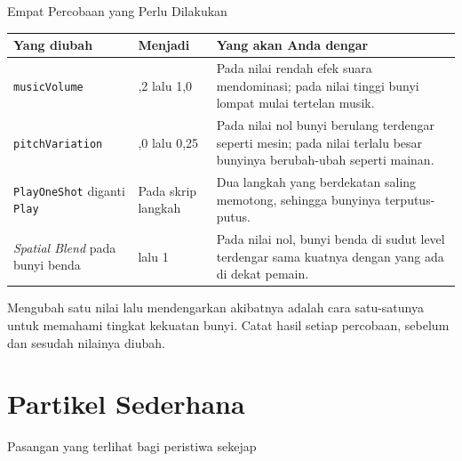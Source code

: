 \documentclass[aspectratio=169,10pt]{beamer}
\begin{document}
\begin{frame}{Empat Percobaan yang Perlu Dilakukan}
{\scriptsize
\renewcommand{\arraystretch}{1.12}
\begin{tabularx}{\textwidth}{@{}>{\raggedright\arraybackslash}p{3.55cm}
    >{\raggedright\arraybackslash}p{3.35cm}
    >{\raggedright\arraybackslash}X@{}}
\toprule
\textbf{Yang diubah} & \textbf{Menjadi} & \textbf{Yang akan Anda dengar} \\
\midrule
\texttt{musicVolume} & 0,2 lalu 1,0 &
  Pada nilai rendah efek suara mendominasi; pada nilai tinggi bunyi lompat
  mulai tertelan musik. \\
\addlinespace
\texttt{pitchVariation} & 0,0 lalu 0,25 &
  Pada nilai nol bunyi berulang terdengar seperti mesin; pada nilai terlalu
  besar bunyinya berubah-ubah seperti mainan. \\
\addlinespace
\texttt{PlayOneShot} diganti \texttt{Play} & Pada skrip langkah &
  Dua langkah yang berdekatan saling memotong, sehingga bunyinya
  terputus-putus. \\
\addlinespace
\emph{Spatial Blend} pada bunyi benda & 0 lalu 1 &
  Pada nilai nol, bunyi benda di sudut level terdengar sama kuatnya dengan yang
  ada di dekat pemain. \\
\bottomrule
\end{tabularx}}
\vspace{0.14cm}
\begin{kotak}
Mengubah satu nilai lalu mendengarkan akibatnya adalah cara satu-satunya untuk
memahami tingkat kekuatan bunyi. Catat hasil setiap percobaan, sebelum dan
sesudah nilainya diubah.
\end{kotak}
\end{frame}

\section{Partikel Sederhana}
  {Pasangan yang terlihat bagi peristiwa sekejap}
\end{document}
